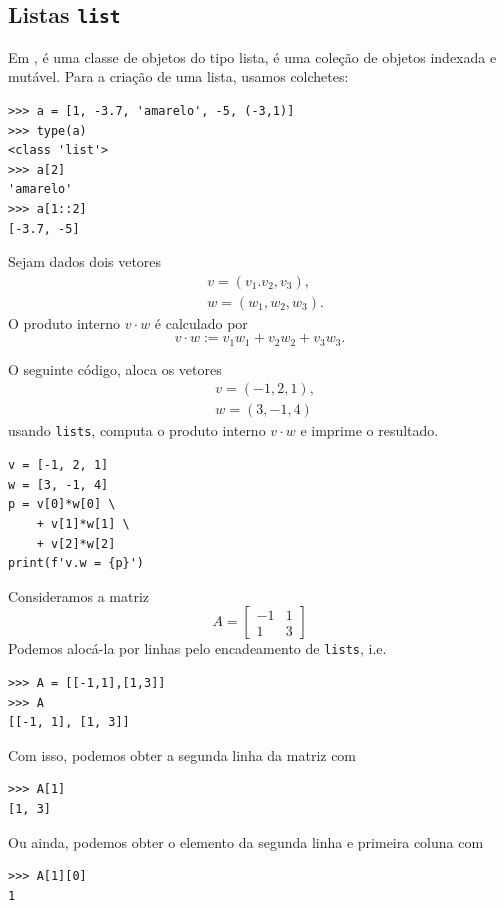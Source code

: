 \subsection{Listas \texttt{list}}

Em {\python}, {\PYTHONlist} é uma classe de objetos do tipo lista, é uma coleção de objetos indexada e mutável. Para a criação de uma lista, usamos colchetes:

\begin{lstlisting}
>>> a = [1, -3.7, 'amarelo', -5, (-3,1)] 
>>> type(a)
<class 'list'>
>>> a[2]
'amarelo'
>>> a[1::2]
[-3.7, -5]
\end{lstlisting}

\begin{ex}
  Sejam dados dois vetores
  \begin{align}
    & v = (v_1. v_2, v_3), \\
    & w = (w_1, w_2, w_3).
  \end{align}
  O produto interno $v\cdot w$ é calculado por
  \begin{equation}
    v\cdot w := v_1w_1 + v_2w_2 + v_3w_3.
  \end{equation}

  O seguinte código, aloca os vetores
  \begin{align}
    & v = (-1, 2, 1), \\
    & w = (3, -1, 4)
  \end{align}
  usando \texttt{lists}, computa o produto interno $v\cdot w$ e imprime o resultado.

\begin{lstlisting}
v = [-1, 2, 1]
w = [3, -1, 4]
p = v[0]*w[0] \
    + v[1]*w[1] \
    + v[2]*w[2]
print(f'v.w = {p}')
\end{lstlisting}

\end{ex}

\begin{ex}
  Consideramos a matriz
  \begin{equation}
    A =
    \begin{bmatrix}
      -1 & 1 \\
      1 & 3 
    \end{bmatrix}
  \end{equation}
  Podemos alocá-la por linhas pelo encadeamento de \texttt{lists}, i.e.

\begin{lstlisting}
>>> A = [[-1,1],[1,3]]
>>> A
[[-1, 1], [1, 3]]
\end{lstlisting}

Com isso, podemos obter a segunda linha da matriz com

\begin{lstlisting}
>>> A[1]
[1, 3]
\end{lstlisting}

Ou ainda, podemos obter o elemento da segunda linha  e primeira coluna com

\begin{lstlisting}
>>> A[1][0]
1
\end{lstlisting}

\end{ex}

